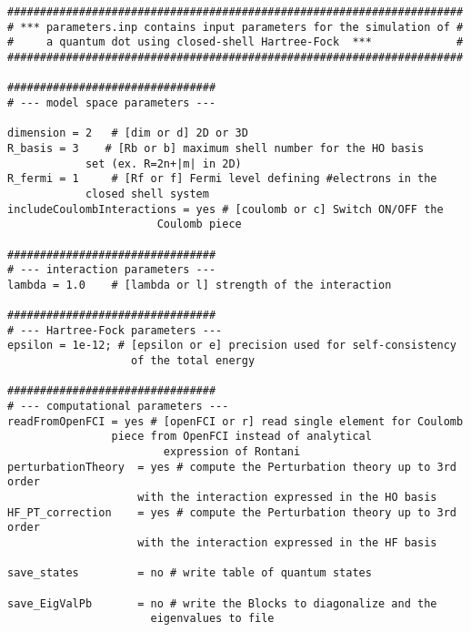 \begin{table}[ht]
\centering      %
\scriptsize 
\begin{verbatim}
######################################################################
# *** parameters.inp contains input parameters for the simulation of #
#     a quantum dot using closed-shell Hartree-Fock  ***             #
######################################################################

################################
# --- model space parameters ---
 
dimension = 2   # [dim or d] 2D or 3D
R_basis = 3    # [Rb or b] maximum shell number for the HO basis
	  	    set (ex. R=2n+|m| in 2D)
R_fermi = 1     # [Rf or f] Fermi level defining #electrons in the
	  	    closed shell system
includeCoulombInteractions = yes # [coulomb or c] Switch ON/OFF the
			     	   Coulomb piece

################################
# --- interaction parameters --- 
lambda = 1.0    # [lambda or l] strength of the interaction

################################
# --- Hartree-Fock parameters ---
epsilon = 1e-12; # [epsilon or e] precision used for self-consistency
                   of the total energy

################################
# --- computational parameters --- 
readFromOpenFCI = yes # [openFCI or r] read single element for Coulomb
		      	piece from OpenFCI instead of analytical
                        expression of Rontani
perturbationTheory  = yes # compute the Perturbation theory up to 3rd order
		      	    with the interaction expressed in the HO basis
HF_PT_correction    = yes # compute the Perturbation theory up to 3rd order
		      	    with the interaction expressed in the HF basis

save_states         = no # write table of quantum states

save_EigValPb       = no # write the Blocks to diagonalize and the
		      	      eigenvalues to file
\end{verbatim}
\caption{Example of input file configuration.}
\label{configFile}
\end{table} 

